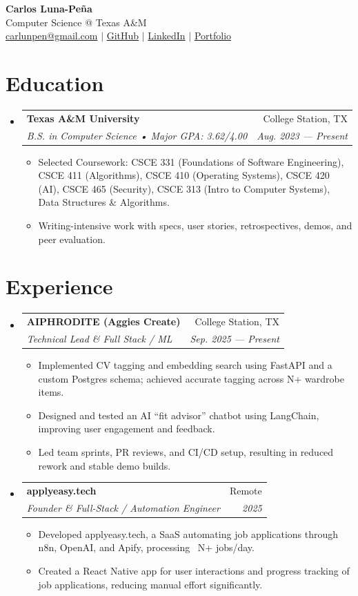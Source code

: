 \documentclass[letterpaper,11pt]{article}
\makeatletter
\newcommand{\resumeItem}[1]{\item\small{{#1 \vspace{-2pt}}}}
\newcommand{\resumeSubheading}[4]{\vspace{-2pt}\item \begin{tabular*}{0.97\textwidth}[t]{l@{\extracolsep{\fill}}r} \textbf{#1} & #2 \\ \textit{\small#3} & \textit{\small #4} \\ \end{tabular*}\vspace{-7pt}}
\newcommand{\resumeSubHeadingListStart}{\begin{itemize}[leftmargin=0.15in, label={}]}
\newcommand{\resumeSubHeadingListEnd}{\end{itemize}}
\newcommand{\resumeItemListStart}{\begin{itemize}}
\newcommand{\resumeItemListEnd}{\end{itemize}\vspace{-5pt}}
\makeatother
\begin{document}
\begin{center}
    {\Huge \textbf{Carlos Luna-Peña}}\\
    \vspace{1mm}
    Computer Science @ Texas A\&M\\
    \vspace{1mm}
    \href{mailto:carlunpen@gmail.com}{carlunpen@gmail.com} $|$ 
    \href{https://github.com/clmoon2}{GitHub} $|$ 
    \href{https://linkedin.com/in/carlos-luna}{LinkedIn} $|$ 
    \href{https://applyeasy.tech}{Portfolio}
\end{center}

\section{Education}
\resumeSubHeadingListStart
\resumeSubheading
{Texas A\&M University}{College Station, TX}
{B.S. in Computer Science • Major GPA: 3.62/4.00}{Aug. 2023 — Present}
\resumeItemListStart
\resumeItem{Selected Coursework: CSCE 331 (Foundations of Software Engineering), CSCE 411 (Algorithms), CSCE 410 (Operating Systems), CSCE 420 (AI), CSCE 465 (Security), CSCE 313 (Intro to Computer Systems), Data Structures \& Algorithms.}
\resumeItem{Writing-intensive work with specs, user stories, retrospectives, demos, and peer evaluation.}
\resumeItemListEnd
\resumeSubHeadingListEnd

\section{Experience}
\resumeSubHeadingListStart
\resumeSubheading
{AIPHRODITE (Aggies Create)}{College Station, TX}
{Technical Lead \& Full Stack / ML}{Sep. 2025 — Present}
\resumeItemListStart
\resumeItem{Implemented CV tagging and embedding search using FastAPI and a custom Postgres schema; achieved accurate tagging across {N}+ wardrobe items.}
\resumeItem{Designed and tested an AI “fit advisor” chatbot using LangChain, improving user engagement and feedback.}
\resumeItem{Led team sprints, PR reviews, and CI/CD setup, resulting in reduced rework and stable demo builds.}
\resumeItemListEnd
\resumeSubheading
{applyeasy.tech}{Remote}
{Founder \& Full-Stack / Automation Engineer}{2025}
\resumeItemListStart
\resumeItem{Developed applyeasy.tech, a SaaS automating job applications through n8n, OpenAI, and Apify, processing ~{N}+ jobs/day.}
\resumeItem{Created a React Native app for user interactions and progress tracking of job applications, reducing manual effort significantly.}
\resumeItemListEnd
\resumeSubHeadingListEnd
\end{document}
